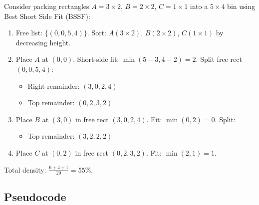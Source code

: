 \begin{example}\label{ex:maxrects}
Consider packing rectangles $A = 3 \times 2$, $B = 2 \times 2$, $C = 1 \times 1$ into a $5 \times 4$ bin using Best Short Side Fit (BSSF):
\begin{enumerate}
    \item Free list: $\{(0,0,5,4)\}$. Sort: $A (3 \times 2)$, $B (2 \times 2)$, $C (1 \times 1)$ by decreasing height.
    \item Place $A$ at $(0,0)$. Short-side fit: $\min(5-3, 4-2) = 2$. Split free rect $(0,0,5,4)$:
      \begin{itemize}
          \item Right remainder: $(3,0,2,4)$
          \item Top remainder: $(0,2,3,2)$
      \end{itemize}
    \item Place $B$ at $(3,0)$ in free rect $(3,0,2,4)$. Fit: $\min(0, 2) = 0$. Split:
      \begin{itemize}
          \item Top remainder: $(3,2,2,2)$
      \end{itemize}
    \item Place $C$ at $(0,2)$ in free rect $(0,2,3,2)$. Fit: $\min(2, 1) = 1$.
\end{enumerate}
Total density: $\frac{6+4+1}{20} = 55\%$.
\end{example}

\subsection{Pseudocode}

